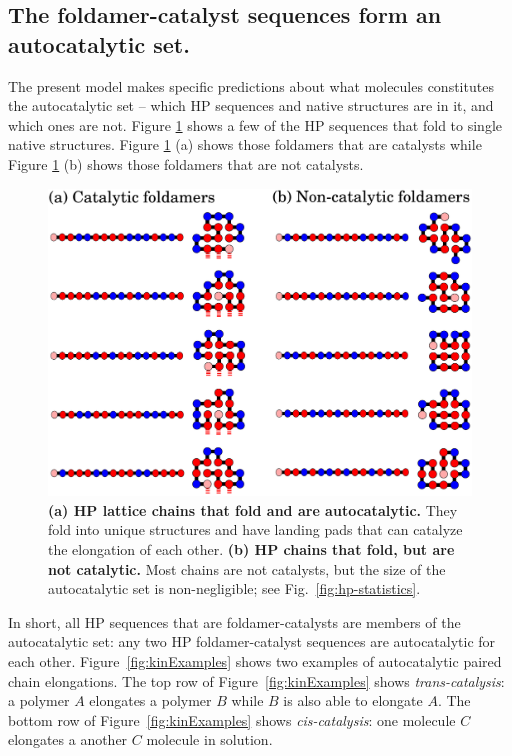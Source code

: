 \documentclass[5p,times]{elsarticle}
\begin{document}
\subsection{The foldamer-catalyst sequences form an autocatalytic set.}

 The present model makes specific predictions about what molecules constitutes the autocatalytic 
set -- which HP sequences and native structures are in it, and which ones are not.  Figure 
\ref{fig:fold-cat} shows a few of the HP sequences that fold to single native structures.  Figure 
\ref{fig:fold-cat} (a) shows those foldamers that are catalysts while Figure \ref{fig:fold-cat} (b) 
shows those foldamers that are not catalysts.  
 
\begin{figure}[htb!]
  \centering
  \includegraphics[width=\columnwidth]{pictures/fold-cat.pdf} 
  \caption{\footnotesize{\textbf{(a) HP lattice chains that fold and are autocatalytic.}  They fold 
into unique structures and have landing pads that can catalyze the elongation of each other.  
\textbf{(b) HP chains that fold, but are not catalytic.}  Most chains are not catalysts, but the 
size of the autocatalytic set is non-negligible; see Fig.~\ref{fig:hp-statistics}.}}
  \label{fig:fold-cat}
\end{figure}

 In short, all HP sequences that are foldamer-catalysts are members of the autocatalytic set: any 
two HP foldamer-catalyst sequences are autocatalytic for each other.  Figure~\ref{fig:kinExamples} 
shows two examples of autocatalytic paired chain elongations.  The top row of 
Figure~\ref{fig:kinExamples} shows \emph{trans-catalysis}: a polymer $A$ elongates a polymer $B$ 
while $B$ is also able to elongate $A$.  The bottom row of Figure~\ref{fig:kinExamples} shows 
\emph{cis-catalysis}: one molecule $C$ elongates a another $C$ molecule in solution.
\end{document}
